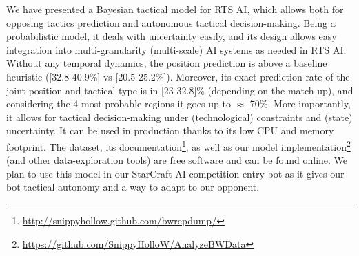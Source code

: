We have presented a Bayesian tactical model for RTS AI, which allows both for opposing tactics prediction and autonomous tactical decision-making. Being a probabilistic model, it deals with uncertainty easily, and its design allows easy integration into multi-granularity (multi-scale) AI systems as needed in RTS AI. Without any temporal dynamics, the position prediction is above a baseline heuristic ([32.8-40.9\%] vs [20.5-25.2\%]). Moreover, its exact prediction rate of the joint position and tactical type is in [23-32.8]\% (depending on the match-up), and considering the 4 most probable regions it goes up to $\approx$ 70\%. More importantly, it allows for tactical decision-making under (technological) constraints and (state) uncertainty. It can be used in production thanks to its low CPU and memory footprint. The dataset, its documentation\footnote{\url{http://snippyhollow.github.com/bwrepdump/}}, as well as our model implementation\footnote{\url{https://github.com/SnippyHolloW/AnalyzeBWData}} (and other data-exploration tools) are free software and can be found online. We plan to use this model in our StarCraft AI competition entry bot as it gives our bot tactical autonomy and a way to adapt to our opponent.
